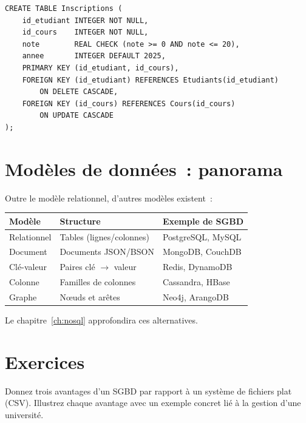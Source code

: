 \begin{codeblock}[title=\textbf{Exemple complet de contraintes}]
\begin{verbatim}
CREATE TABLE Inscriptions (
    id_etudiant INTEGER NOT NULL,
    id_cours    INTEGER NOT NULL,
    note        REAL CHECK (note >= 0 AND note <= 20),
    annee       INTEGER DEFAULT 2025,
    PRIMARY KEY (id_etudiant, id_cours),
    FOREIGN KEY (id_etudiant) REFERENCES Etudiants(id_etudiant)
        ON DELETE CASCADE,
    FOREIGN KEY (id_cours) REFERENCES Cours(id_cours)
        ON UPDATE CASCADE
);
\end{verbatim}
\end{codeblock}

\section{Mod\`eles de donn\'ees~: panorama}

Outre le mod\`ele relationnel, d'autres mod\`eles existent~:

\begin{center}
\begin{tabular}{lll}
\toprule
\textbf{Mod\`ele} & \textbf{Structure} & \textbf{Exemple de SGBD} \\
\midrule
Relationnel & Tables (lignes/colonnes) & PostgreSQL, MySQL \\
Document & Documents JSON/BSON & MongoDB, CouchDB \\
Cl\'e-valeur & Paires cl\'e $\to$ valeur & Redis, DynamoDB \\
Colonne & Familles de colonnes & Cassandra, HBase \\
Graphe & N\oe{}uds et ar\^etes & Neo4j, ArangoDB \\
\bottomrule
\end{tabular}
\end{center}

Le chapitre~\ref{ch:nosql} approfondira ces alternatives.

\section*{Exercices}

\begin{exercice}
Donnez trois avantages d'un SGBD par rapport \`a un syst\`eme de fichiers plat
(CSV). Illustrez chaque avantage avec un exemple concret li\'e \`a la gestion
d'une universit\'e.
\end{exercice}

